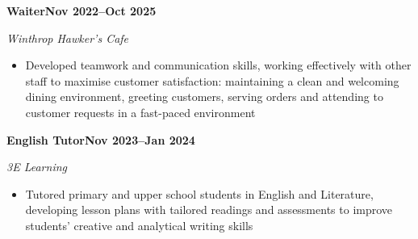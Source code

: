\documentclass[11pt,a4paper]{article}
\newcommand{\cvitemlong}[3]{%
    \noindent\textbf{#1}\hfill\textbf{#2}\par\textit{#3}
}
\begin{document}
\cvitemlong%
    {Waiter}%
    {Nov 2022--Oct 2025}%
    {Winthrop Hawker's Cafe}

\begin{itemize}
    \item Developed teamwork and communication skills, working effectively with other staff to maximise customer satisfaction: maintaining a clean and welcoming dining environment, greeting customers, serving orders and attending to customer requests in a fast-paced environment
\end{itemize}

\cvitemlong%
    {English Tutor}%
    {Nov 2023--Jan 2024}%
    {3E Learning}

\begin{itemize}
    \item Tutored primary and upper school students in English and Literature, developing lesson plans with tailored readings and assessments to improve students' creative and analytical writing skills
\end{itemize}
\end{document}
